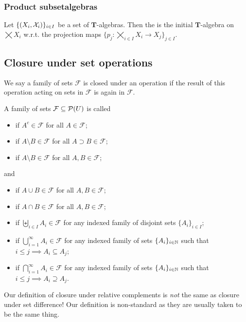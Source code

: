\subsubsection{Product subsetalgebras}
\begin{definition}
Let $\{\sSet{X_i,\mathcal{X}_i}\}_{i\in I}$ be a set of $\boldsymbol{T}$-algebras. Then the  is the initial $\boldsymbol{T}$-algebra on $\bigtimes X_i$ w.r.t. the projection maps $\{p_j: \bigtimes_{i\in I}X_i\to X_j\}_{j\in I}$.
\end{definition}



\subsection{Closure under set operations}
We say a family of sets $\mathcal{F}$ is closed under an operation if the result of this operation acting on sets in $\mathcal{F}$ is again in $\mathcal{F}$.

\begin{definition}
A family of sets $\mathcal{F}\subseteq\operatorname{\mathcal{P}}(U)$ is called
\begin{itemize}
\item {} if $A^c\in\mathcal{F}$ for all $A\in\mathcal{F}$;
\item {} if $A\setminus B\in\mathcal{F}$ for all $A \supset B\in\mathcal{F}$;
\item {} if $A\setminus B\in\mathcal{F}$ for all $A, B\in\mathcal{F}$;
\end{itemize}
and
\begin{itemize}
\item {} if $A\cup B \in\mathcal{F}$ for all $A,B\in\mathcal{F}$;
\item {} if $A\cap B \in\mathcal{F}$ for all $A,B\in\mathcal{F}$;
\item {} if $\biguplus_{i\in I}A_i \in\mathcal{F}$ for any indexed family of disjoint sets $\{A_i\}_{i\in I}$;
\item {} if $\bigcup_{i=1}^\infty A_i \in\mathcal{F}$ for any indexed family of sets $\{A_i\}_{i\in \mathbb{N}}$ such that $i\leq j \implies A_i \subseteq A_j$;
\item {} if $\bigcap_{i=1}^\infty A_i \in\mathcal{F}$ for any indexed family of sets $\{A_i\}_{i\in \mathbb{N}}$ such that $i\leq j \implies A_i \supseteq A_j$.
\end{itemize}
Our definition of closure under relative complements is \emph{not} the same as closure under set difference! Our definition is non-standard as they are usually taken to be the same thing.
\end{definition}

